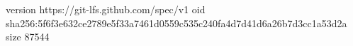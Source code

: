 version https://git-lfs.github.com/spec/v1
oid sha256:5f6f3e632ce2789e5f33a7461d0559c535c240fa4d7d41d6a26b7d3cc1a53d2a
size 87544
